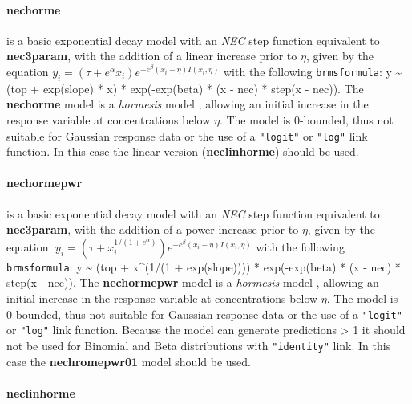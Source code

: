 \documentclass[
  shortnames]{jss}
\begin{document}
\hypertarget{nechorme}{%
\paragraph{nechorme}\label{nechorme}}

is a basic exponential decay model with an \emph{NEC} step function equivalent to \textbf{nec3param}, with the addition of a linear increase prior to \(\eta\), given by the equation
\(y_i = (\tau + e^{\alpha} x_i) e^{-e^{\beta} \left(x_i - \eta \right) I(x_i, \eta)}\)
with the following \texttt{brmsformula}: y \textasciitilde{} (top + exp(slope) * x) * exp(-exp(beta) * (x - nec) * step(x - nec)). The \textbf{nechorme} model is a \emph{hormesis} model \citep{Mattson2008}, allowing an initial increase in the response variable at concentrations below \(\eta\). The model is 0-bounded, thus not suitable for Gaussian response data or the use of a \texttt{"logit"} or \texttt{"log"} link function. In this case the linear version (\textbf{neclinhorme}) should be used.

\hypertarget{nechormepwr}{%
\paragraph{nechormepwr}\label{nechormepwr}}

is a basic exponential decay model with an \emph{NEC} step function equivalent to \textbf{nec3param}, with the addition of a power increase prior to \(\eta\), given by the equation:
\(y_i = (\tau + x_i^{1/(1+e^{\alpha})}) e^{-e^{\beta} \left(x_i - \eta \right) I(x_i, \eta)}\)
with the following \texttt{brmsformula}: y \textasciitilde{} (top + x\^{}(1/(1 + exp(slope)))) * exp(-exp(beta) * (x - nec) * step(x - nec)). The \textbf{nechormepwr} model is a \emph{hormesis} model \citep{Mattson2008}, allowing an initial increase in the response variable at concentrations below \(\eta\). The model is 0-bounded, thus not suitable for Gaussian response data or the use of a \texttt{"logit"} or \texttt{"log"} link function. Because the model can generate predictions \textgreater{} 1 it should not be used for Binomial and Beta distributions with \texttt{"identity"} link. In this case the \textbf{nechromepwr01} model should be used.

\hypertarget{neclinhorme}{%
\paragraph{neclinhorme}\label{neclinhorme}}
\end{document}
